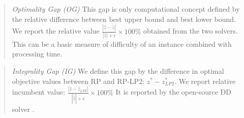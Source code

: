 \begin{quote}
	\noindent\textit{Optimality Gap (OG)} This gap is only computational concept defined by the relative difference between best upper bound and best lower bound. We report the relative value $\frac{|\hat{z}-\tilde{z}|}{|\hat{z}|+\epsilon}\times 100\%$ obtained from the two solvers. This can be a basic measure of difficulty of an instance combined with processing time.
\end{quote}


\begin{quote}
	\noindent\textit{Integrality Gap (IG)} We define this gap by the difference in optimal objective values between RP and RP-LP2: $z^*-z^*_{LP2}$. We report relative incumbent value: $\frac{|\hat{z}-\hat{z}_{LP2}|}{|\hat{\hat{z}}|+\epsilon}\times 100\%$ It is reported by the open-source DD solver \dsp. 
	
\end{quote}

